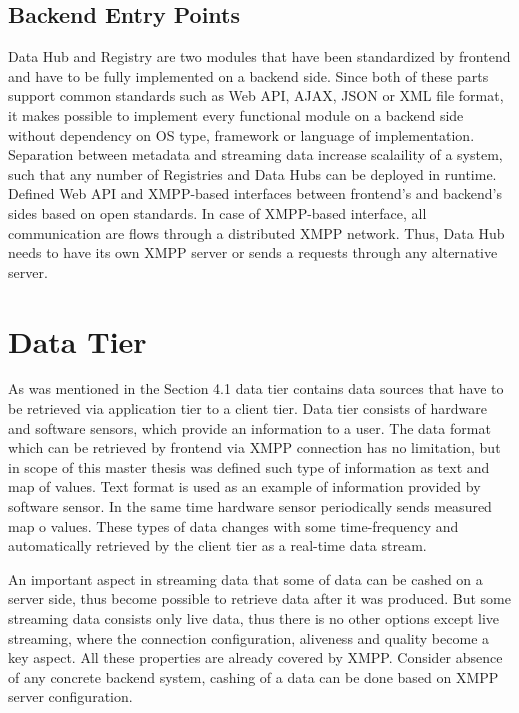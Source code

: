 \subsection{Backend Entry Points}
    Data Hub and Registry are two modules that have been standardized by frontend and have to be fully implemented on a backend side. Since both of these parts support common standards such as Web API, AJAX, JSON or XML file format, it makes possible to implement every functional module on a backend side without dependency on OS type, framework or language of implementation. Separation between metadata and streaming data increase scalaility of a system, such that any number of Registries and Data Hubs can be deployed in runtime. Defined Web API and XMPP-based interfaces between frontend's and backend's sides based on open standards. In case of XMPP-based interface, all communication are flows through a distributed XMPP network. Thus, Data Hub needs to have its own XMPP server or sends a requests through any alternative server.

\section{Data Tier}
   As was mentioned in the Section 4.1 data tier contains data sources that have to be retrieved via application tier to a client tier. Data tier consists of hardware and software sensors, which provide an information to a user. The data format which can be retrieved by frontend via XMPP connection has no limitation, but in scope of this master thesis was defined such type of information as text and map of values. Text format is used as an example of information provided by software sensor. In the same time hardware sensor periodically sends measured map o values. These types of data changes with some time-frequency and automatically retrieved by the client tier as a real-time data stream.

  An important aspect in streaming data that some of data can be cashed on a server side, thus become possible to retrieve data after it was produced. But some streaming data consists only live data, thus there is no other options except live streaming, where the connection configuration, aliveness and quality become a key aspect. All these properties are already covered by XMPP. Consider absence of any concrete backend system, cashing of a data can be done based on XMPP server configuration. 

